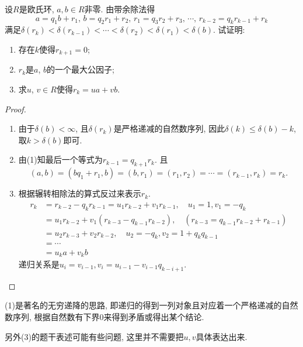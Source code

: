 \begin{problem}[辗转相除法]
    设$R$是欧氏环, $a, b \in R$非零. 由带余除法得
    \[
        a = q_{1}b + r_{1},\, b = q_{2}r_{1} + r_{2},\, r_{1} = q_{3}r_{2} + r_{3},\, \cdots,\, r_{k- 2}= q_{k}r_{k- 1} + r_{k}
    \]
    满足$\delta(r_k) < \delta(r_{k - 1}) < \cdots < \delta(r_2) < \delta(r_1) < \delta(b)$. 试证明:
    \begin{enumerate}[(1)]
        \item 存在$k$使得$r_{k + 1} = 0$;
        \item $r_k$是$a$, $b$的一个最大公因子;
        \item 求$u$, $v \in R$使得$r_k = ua + vb$.
    \end{enumerate}
\end{problem}

\begin{proof}
    \begin{enumerate}[(1)]
        \item 由于$\delta(b) < \infty$, 且$\delta(r_k)$是严格递减的自然数序列, 因此$\delta(k) \leqslant \delta(b) - k$, 取$k > \delta(b)$即可.
        \item 由(1)知最后一个等式为$r_{k - 1} = q_{k + 1}r_{k}$. 且
        \[
            (a, b) = (bq_1 + r_1, b) = (b, r_1) = (r_1, r_2) = \cdots = (r_{k - 1}, r_k) = r_k.
        \]
        \item 根据辗转相除法的算式反过来表示$r_k$.
        \[
        \begin{aligned}
            r_k &= r_{k - 2} - q_kr_{k - 1} = u_1r_{k - 2} + v_1r_{k - 1},\quad u_1 = 1, v_1 = -q_k\\ 
            &= u_1r_{k - 2} + v_1(r_{k - 3} - q_{k - 1}r_{k - 2}),\quad (r_{k - 3} = q_{k - 1}r_{k - 2} + r_{k - 1})\\
            &= u_2r_{k - 3} + v_2r_{k - 2}, \quad u_2 = -q_k, v_2 = 1 + q_kq_{k - 1}\\
            &= \cdots \\
            &= u_ka + v_kb 
        \end{aligned}
        \]
        递归关系是$u_i = v_{i - 1}, v_i = u_{i - 1} - v_{i - 1}q_{k - i + 1}$.
    \end{enumerate}
\end{proof}

\begin{remark}
    (1)是著名的无穷递降的思路, 即递归的得到一列对象且对应着一个严格递减的自然数序列, 根据自然数有下界$0$来得到矛盾或得出某个结论.

    另外(3)的题干表述可能有些问题, 这里并不需要把$u, v$具体表达出来.
\end{remark}

